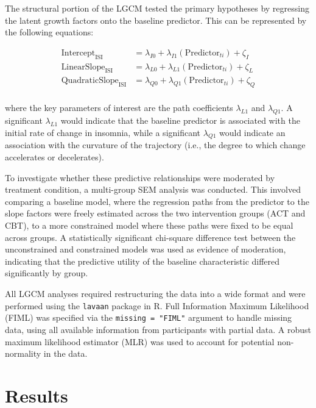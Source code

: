 \documentclass[
  man]{apa6}
\begin{document}
The structural portion of the LGCM tested the primary hypotheses by regressing the latent growth factors onto the baseline predictor. This can be represented by the following equations:

\[
\begin{aligned}
  \text{Intercept}_\text{ISI} &= \lambda_{I0} + \lambda_{I1}(\text{Predictor}_{ti}) + \zeta_I \\
  \text{LinearSlope}_\text{ISI} &= \lambda_{L0} + \lambda_{L1}(\text{Predictor}_{ti}) + \zeta_L \\
  \text{QuadraticSlope}_\text{ISI} &= \lambda_{Q0} + \lambda_{Q1}(\text{Predictor}_{ti}) + \zeta_Q \\
\end{aligned}
\]

where the key parameters of interest are the path coefficients \(\lambda_{L1}\) and \(\lambda_{Q1}\). A significant \(\lambda_{L1}\) would indicate that the baseline predictor is associated with the initial rate of change in insomnia, while a significant \(\lambda_{Q1}\) would indicate an association with the curvature of the trajectory (i.e., the degree to which change accelerates or decelerates).

To investigate whether these predictive relationships were moderated by treatment condition, a multi-group SEM analysis was conducted. This involved comparing a baseline model, where the regression paths from the predictor to the slope factors were freely estimated across the two intervention groups (ACT and CBT), to a more constrained model where these paths were fixed to be equal across groups. A statistically significant chi-square difference test between the unconstrained and constrained models was used as evidence of moderation, indicating that the predictive utility of the baseline characteristic differed significantly by group.

All LGCM analyses required restructuring the data into a wide format and were performed using the \texttt{lavaan} package in R. Full Information Maximum Likelihood (FIML) was specified via the \texttt{missing\ =\ "FIML"} argument to handle missing data, using all available information from participants with partial data. A robust maximum likelihood estimator (MLR) was used to account for potential non-normality in the data.

\section{Results}\label{results}
\end{document}
